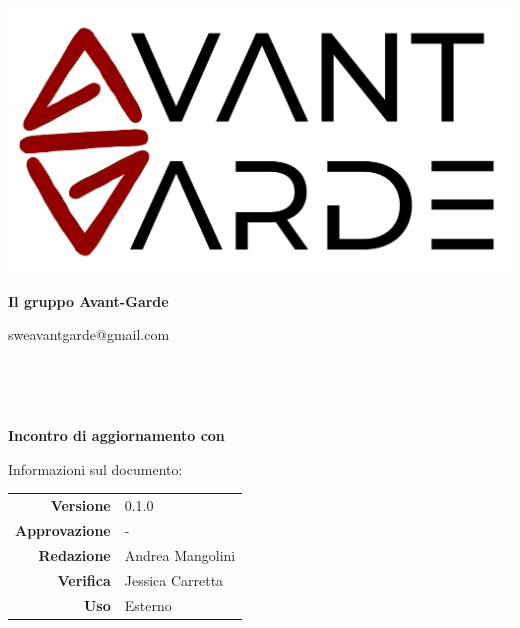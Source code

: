     \begin{titlepage}
        \begin{center}
            \includegraphics[width=\textwidth]{logo+scritta.png}

            \vspace{0.5cm}
            {\huge \textbf{Il gruppo Avant-Garde}}

            \vspace{0.4cm}
            \large{sweavantgarde@gmail.com}

            \vspace{1.5cm}
            \hrulefill\\
            \vspace{0.2cm}
            
            \textbf{\titoloDocumento}\\
            \vspace{0.5cm}

            \textbf{Incontro di aggiornamento con \textcolor{red}{\nomeAzienda}}\\
            \hrulefill

            \vfill
            Informazioni sul documento:\\
            \vspace{0.3cm}
                \begin{tabular}{ r | l }
                    \textbf{Versione} & 0.1.0\\ %
                    \textbf{Approvazione} & -\\ %
                    \textbf{Redazione} & Andrea Mangolini\\ %
                    \textbf{Verifica} & Jessica Carretta\\ %
                    \textbf{Uso} & Esterno\\ %
                \end{tabular}
        \end{center}
    \end{titlepage}
\restoregeometry
